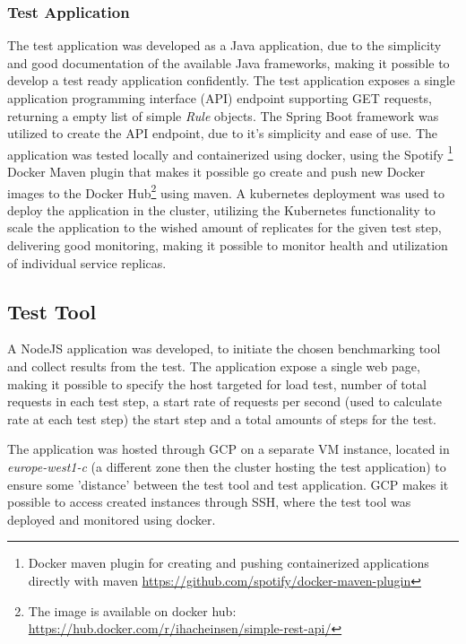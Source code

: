 \subsubsection{Test Application}
The test application was developed as a Java application, due to the simplicity and good documentation of the available Java frameworks, making it possible to develop a test ready application confidently. The test application exposes a single application programming interface (API) endpoint supporting GET requests, returning a empty list of simple \textit{Rule} objects. The Spring Boot framework was utilized to create the API endpoint, due to it's simplicity and ease of use. The application was tested locally and containerized using docker, using the Spotify \footnote{Docker maven plugin for creating and pushing containerized applications directly with maven \url{https://github.com/spotify/docker-maven-plugin}} Docker Maven plugin that makes it possible go create and push new Docker images to the Docker Hub\footnote{The image is available on docker hub: \url{https://hub.docker.com/r/ihacheinsen/simple-rest-api/}} using maven. A kubernetes deployment was  used to deploy the application in the cluster, utilizing the Kubernetes functionality to scale the application to the wished amount of replicates for the given test step, delivering good monitoring, making it possible to monitor health and utilization of individual service replicas.

\subsection{Test Tool}
A NodeJS application was developed, to initiate the chosen benchmarking tool and collect results from the test. The application expose a single web page, making it possible to specify the host targeted for load test, number of total requests in each test step, a start rate of requests per second (used to calculate rate at each test step) the start step and a total amounts of steps for the test. 

The application was hosted through GCP on a separate VM instance, located in \textit{europe-west1-c} (a different zone then the cluster hosting the test application) to ensure some 'distance' between the test tool and test application. GCP makes it possible to access created instances through SSH, where the test tool was deployed and monitored using docker.


